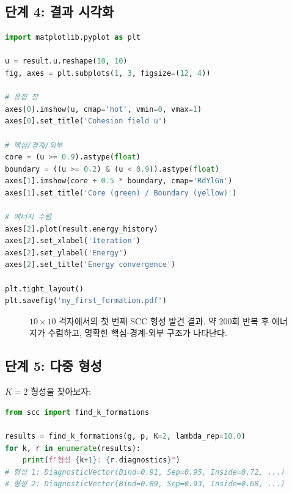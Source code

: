 \subsection{단계 4: 결과 시각화}

\begin{lstlisting}[language=Python, caption={형성 시각화 (matplotlib)}]
import matplotlib.pyplot as plt

u = result.u.reshape(10, 10)
fig, axes = plt.subplots(1, 3, figsize=(12, 4))

# 응집 장
axes[0].imshow(u, cmap='hot', vmin=0, vmax=1)
axes[0].set_title('Cohesion field u')

# 핵심/경계/외부
core = (u >= 0.9).astype(float)
boundary = ((u >= 0.2) & (u < 0.9)).astype(float)
axes[1].imshow(core + 0.5 * boundary, cmap='RdYlGn')
axes[1].set_title('Core (green) / Boundary (yellow)')

# 에너지 수렴
axes[2].plot(result.energy_history)
axes[2].set_xlabel('Iteration')
axes[2].set_ylabel('Energy')
axes[2].set_title('Energy convergence')

plt.tight_layout()
plt.savefig('my_first_formation.pdf')
\end{lstlisting}

\begin{figure}[t]
\centering
{}
\caption{$10 \times 10$ 격자에서의 첫 번째 SCC 형성 발견 결과. 약 200회 반복 후 에너지가 수렴하고, 명확한 핵심-경계-외부 구조가 나타난다.}
\label{fig:first-formation}
\end{figure}

\subsection{단계 5: 다중 형성}

$K = 2$ 형성을 찾아보자:
\begin{lstlisting}[language=Python, caption={다중 형성 발견}]
from scc import find_k_formations

results = find_k_formations(g, p, K=2, lambda_rep=10.0)
for k, r in enumerate(results):
    print(f"형성 {k+1}: {r.diagnostics}")
# 형성 1: DiagnosticVector(Bind=0.91, Sep=0.95, Inside=0.72, ...)
# 형성 2: DiagnosticVector(Bind=0.89, Sep=0.93, Inside=0.68, ...)
\end{lstlisting}

